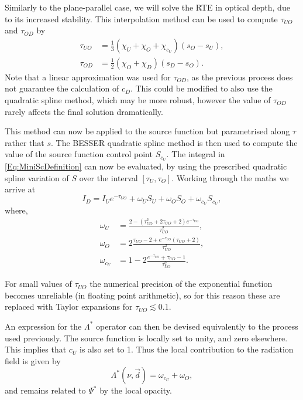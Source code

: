 Similarly to the plane-parallel case, we will solve the RTE in optical depth, due to its increased stability.
This interpolation method can be used to compute $\tau_{UO}$ and $\tau_{OD}$ by
\begin{align}
    \tau_{UO} &= \frac{1}{3}(\chi_U + \chi_O + \chi_{c_U}) (s_O - s_U),\\
    \tau_{OD} &= \frac{1}{2}(\chi_O + \chi_D) (s_D - s_O).
\end{align}
Note that a linear approximation was used for $\tau_{OD}$, as the previous process does not guarantee the calculation of $c_D$.
This could be modified to also use the quadratic spline method, which may be more robust, however the value of $\tau_{OD}$ rarely affects the final solution dramatically.

This method can now be applied to the source function but parametrised along $\tau$ rather that $s$.
The BESSER quadratic spline method is then used to compute the value of the source function control point $S_{c_U}$.
The integral in \eqref{Eq:MiniScDefinition} can now be evaluated, by using the prescribed quadratic spline variation of $S$ over the interval $[\tau_{U}, \tau_{O}]$.
Working through the maths we arrive at
\begin{equation}
    I_D = I_Ue^{-\tau_{UO}} + \omega_U S_U + \omega_O S_O + \omega_{c_U} S_{c_U},
\end{equation}
where,
{
\def\edt{e^{-\tau_{UO}}}
\def\tsq{\tau_{UO}^2}
\begin{align}
    \omega_U &= \frac{2 - (\tsq + 2\tau_{UO} + 2)\edt}{\tsq},\\
    \omega_O &= 2\frac{\tau_{UO} - 2 + \edt (\tau_{UO} + 2)}{\tsq},\\
    \omega_{c_U} &= 1 - 2 \frac{\edt + \tau_{UO} - 1}{\tsq}.
\end{align}
}

For small values of $\tau_{UO}$ the numerical precision of the exponential function becomes unreliable (in floating point arithmetic), so for this reason these are replaced with Taylor expansions for $\tau_{UO}\lesssim 0.1$.

An expression for the $\Lambda^*$ operator can then be devised equivalently to the process used previously.
The source function is locally set to unity, and zero elsewhere.
This implies that $c_U$ is also set to 1.
Thus the local contribution to the radiation field is given by
\begin{equation}
    \Lambda^*(\nu, \vec{d}) = \omega_{c_U} + \omega_O,
\end{equation}
and remains related to $\Psi^*$ by the local opacity.

